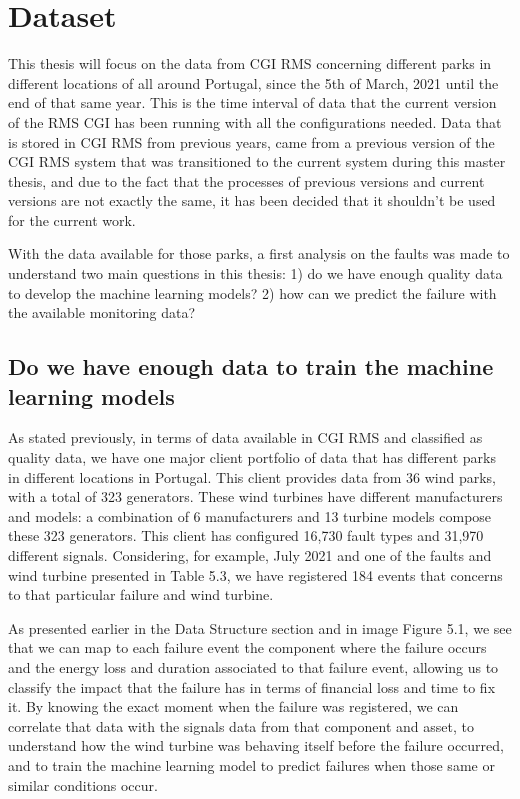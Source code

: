 \section{Dataset}
\label{sub:if_you_use_this_template} 
This thesis will focus on the data from CGI RMS concerning different parks in different locations of all around Portugal, since the 5th of March, 2021 until the end of that same year. This is the time interval of data that the current version of the RMS CGI has been running with all the configurations needed. Data that is stored in CGI RMS from previous years, came from a previous version of the CGI RMS system that was transitioned to the current system during this master thesis, and due to the fact that the processes of previous versions and current versions are not exactly the same, it has been decided that it shouldn't be used for the current work.

With the data available for those parks, a first analysis on the faults was made to understand two main questions in this thesis: 1) do we have enough quality data to develop the machine learning models? 2) how can we predict the failure with the available monitoring data? 

\subsection{Do we have enough data to train the machine learning models} 
\label{sub:if_you_use_this_template} 

As stated previously, in terms of data available in CGI RMS and classified as quality data, we have one major client portfolio of data that has different parks in different locations in Portugal. This client provides data from 36 wind parks, with a total of 323 generators. These wind turbines have different manufacturers and models: a combination of 6 manufacturers and 13 turbine models compose these 323 generators. This client has configured 16,730 fault types and 31,970 different signals.
Considering, for example, July 2021 and one of the faults and wind turbine presented in Table 5.3, we have registered 184 events that concerns to that particular failure and wind turbine.

As presented earlier in the Data Structure section and in image Figure 5.1, we see that we can map to each failure event the component where the failure occurs and the energy loss and duration associated to that failure event, allowing us to classify the impact that the failure has in terms of financial loss and time to fix it. By knowing the exact moment when the failure was registered, we can correlate that data with the signals data from that component and asset, to understand how the wind turbine was behaving itself before the failure occurred, and to train the machine learning model to predict failures when those same or similar conditions occur.

